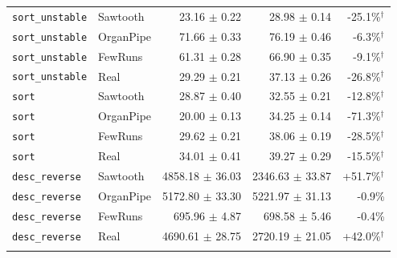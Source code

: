 \begin{tabular*}{\textwidth}{@{\extracolsep\fill}llrrr@{\extracolsep\fill}}
\texttt{sort\_unstable} & Sawtooth & 23.16 $\pm$ 0.22 & 28.98 $\pm$ 0.14 & -25.1\%$^{\dagger}$ \\
\texttt{sort\_unstable} & OrganPipe & 71.66 $\pm$ 0.33 & 76.19 $\pm$ 0.46 & -6.3\%$^{\dagger}$ \\
\texttt{sort\_unstable} & FewRuns & 61.31 $\pm$ 0.28 & 66.90 $\pm$ 0.35 & -9.1\%$^{\dagger}$ \\
\texttt{sort\_unstable} & Real & 29.29 $\pm$ 0.21 & 37.13 $\pm$ 0.26 & -26.8\%$^{\dagger}$ \\
\texttt{sort} & Sawtooth & 28.87 $\pm$ 0.40 & 32.55 $\pm$ 0.21 & -12.8\%$^{\dagger}$ \\
\texttt{sort} & OrganPipe & 20.00 $\pm$ 0.13 & 34.25 $\pm$ 0.14 & -71.3\%$^{\dagger}$ \\
\texttt{sort} & FewRuns & 29.62 $\pm$ 0.21 & 38.06 $\pm$ 0.19 & -28.5\%$^{\dagger}$ \\
\texttt{sort} & Real & 34.01 $\pm$ 0.41 & 39.27 $\pm$ 0.29 & -15.5\%$^{\dagger}$ \\
\texttt{desc\_reverse} & Sawtooth & 4858.18 $\pm$ 36.03 & 2346.63 $\pm$ 33.87 & +51.7\%$^{\dagger}$ \\
\texttt{desc\_reverse} & OrganPipe & 5172.80 $\pm$ 33.30 & 5221.97 $\pm$ 31.13 & -0.9\% \\
\texttt{desc\_reverse} & FewRuns & 695.96 $\pm$ 4.87 & 698.58 $\pm$ 5.46 & -0.4\% \\
\texttt{desc\_reverse} & Real & 4690.61 $\pm$ 28.75 & 2720.19 $\pm$ 21.05 & +42.0\%$^{\dagger}$ \\
\botrule
\end{tabular*}
